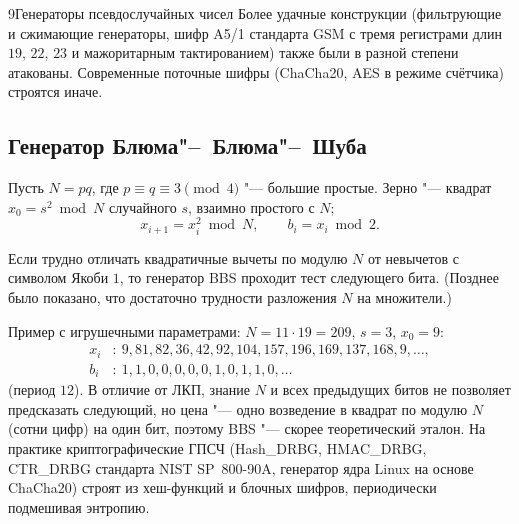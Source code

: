 \begin{lecture}{9}{Генераторы псевдослучайных чисел}
Более удачные конструкции (фильтрующие и сжимающие генераторы, шифр A5/1 стандарта GSM с тремя
регистрами длин $19$, $22$, $23$ и мажоритарным тактированием) также были в разной степени
атакованы. Современные поточные шифры (ChaCha20, AES в режиме счётчика) строятся иначе.

\subsection{Генератор Блюма"--~Блюма"--~Шуба}

Пусть $N = pq$, где $p \equiv q \equiv 3 \pmod 4$ "--- большие простые. Зерно "--- квадрат
$x_0 = s^2 \bmod N$ случайного $s$, взаимно простого с $N$;
\[
  x_{i+1} = x_i^2 \bmod N, \qquad b_i = x_i \bmod 2 .
\]

\begin{theorem}
Если трудно отличать квадратичные вычеты по модулю $N$ от невычетов с символом Якоби $1$, то
генератор BBS проходит тест следующего бита. (Позднее было показано, что достаточно трудности
разложения $N$ на множители.)
\end{theorem}

Пример с игрушечными параметрами: $N = 11 \cdot 19 = 209$, $s = 3$, $x_0 = 9$:
\[
\begin{aligned}
  x_i&:\ 9, 81, 82, 36, 42, 92, 104, 157, 196, 169, 137, 168, 9, \dots,\\
  b_i&:\ 1, 1, 0, 0, 0, 0, 0, 1, 0, 1, 1, 0, \dots
\end{aligned}
\]
(период $12$). В отличие от ЛКП, знание $N$ и всех предыдущих битов не позволяет предсказать
следующий, но цена "--- одно возведение в квадрат по модулю $N$ (сотни цифр) на один бит, поэтому
BBS "--- скорее теоретический эталон. На практике криптографические ГПСЧ (Hash\_DRBG, HMAC\_DRBG,
CTR\_DRBG стандарта NIST SP~800-90A, генератор ядра Linux на основе ChaCha20) строят из хеш-функций
и блочных шифров, периодически подмешивая энтропию.


\checkyourselfsection


\end{lecture}
